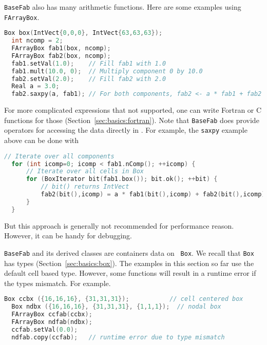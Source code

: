 {\tt BaseFab} also has many arithmetic functions.  Here are some
examples using {\tt FArrayBox}.
\begin{lstlisting}[language=cpp]
  Box box(IntVect{0,0,0}, IntVect{63,63,63});
  int ncomp = 2;
  FArrayBox fab1(box, ncomp);
  FArrayBox fab2(box, ncomp);
  fab1.setVal(1.0);    // Fill fab1 with 1.0
  fab1.mult(10.0, 0);  // Multiply component 0 by 10.0
  fab2.setVal(2.0);    // Fill fab2 with 2.0
  Real a = 3.0;
  fab2.saxpy(a, fab1); // For both components, fab2 <- a * fab1 + fab2
\end{lstlisting}
For more complicated expressions that not supported, one can write
Fortran or C functions for those (Section~\ref{sec:basics:fortran}).
Note that {\tt BaseFab} does provide operators for accessing the
data directly in \cpp.  For example, the {\tt saxpy} example above can
be done with
\begin{lstlisting}[language=cpp]
  // Iterate over all components
  for (int icomp=0; icomp < fab1.nComp(); ++icomp) {
      // Iterate over all cells in Box
      for (BoxIterator bit(fab1.box()); bit.ok(); ++bit) {
          // bit() returns IntVect
          fab2(bit(),icomp) = a * fab1(bit(),icomp) + fab2(bit(),icomp);
      }
  }
\end{lstlisting}
But this approach is generally not recommended for performance reason.
However, it can be handy for debugging.

{\tt BaseFab} and its derived classes are containers data on {\tt
  Box}.  We recall that {\tt Box} has types
(Section~\ref{sec:basics:box}).  The examples in this section so far
use the default cell based type.  However, some functions will result
in a runtime error if the types mismatch.  For example.
\begin{lstlisting}[language=cpp]
  Box ccbx ({16,16,16}, {31,31,31});           // cell centered box
  Box ndbx ({16,16,16}, {31,31,31}, {1,1,1});  // nodal box
  FArrayBox ccfab(ccbx);
  FArrayBox ndfab(ndbx);
  ccfab.setVal(0.0);
  ndfab.copy(ccfab);   // runtime error due to type mismatch
\end{lstlisting}

